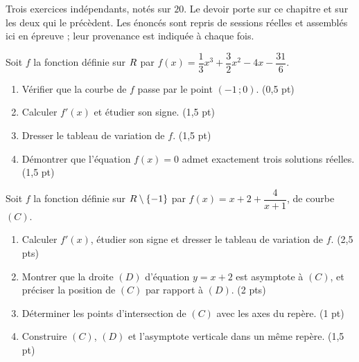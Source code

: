 \begin{devoir}[2 heures]
Trois exercices indépendants, notés sur $20$. Le devoir porte sur ce chapitre
et sur les deux qui le précèdent. Les énoncés sont repris de sessions réelles
et assemblés ici en épreuve ; leur provenance est indiquée à chaque fois.

Soit $f$ la fonction définie sur $R$ par
$f(x) = \dfrac{1}{3}x^{3}+\dfrac{3}{2}x^{2}-4x-\dfrac{31}{6}$.
\begin{enumerate}[label=\textbf{\arabic*.}, leftmargin=*, itemsep=0.2em]
  \item Vérifier que la courbe de $f$ passe par le point $(-1\,;0)$.
        \hfill\textup{(0,5 pt)}
  \item Calculer $f'(x)$ et étudier son signe. \hfill\textup{(1,5 pt)}
  \item Dresser le tableau de variation de $f$. \hfill\textup{(1,5 pt)}
  \item Démontrer que l'équation $f(x) = 0$ admet exactement trois solutions
        réelles. \hfill\textup{(1,5 pt)}
\end{enumerate}

Soit $f$ la fonction définie sur $R\setminus\{-1\}$ par
$f(x) = x+2+\dfrac{4}{x+1}$, de courbe $(C)$.
\begin{enumerate}[label=\textbf{\arabic*.}, leftmargin=*, itemsep=0.2em]
  \item Calculer $f'(x)$, étudier son signe et dresser le tableau de
        variation de $f$. \hfill\textup{(2,5 pts)}
  \item Montrer que la droite $(D)$ d'équation $y = x+2$ est asymptote à
        $(C)$, et préciser la position de $(C)$ par rapport à $(D)$.
        \hfill\textup{(2 pts)}
  \item Déterminer les points d'intersection de $(C)$ avec les axes du
        repère. \hfill\textup{(1 pt)}
  \item Construire $(C)$, $(D)$ et l'asymptote verticale dans un même repère.
        \hfill\textup{(1,5 pt)}
\end{enumerate}


\end{devoir}
